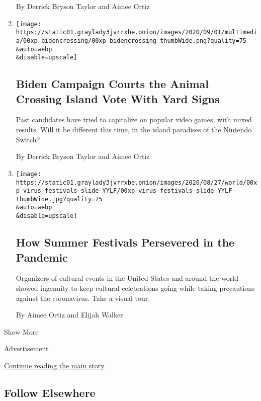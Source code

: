 \begin{enumerate}
  By Derrick Bryson Taylor and Aimee Ortiz
\item
  \href{/2020/09/01/us/politics/biden-animal-crossing.html}{}

  \texttt{[image: https://static01.graylady3jvrrxbe.onion/images/2020/09/01/multimedia/00xp-bidencrossing/00xp-bidencrossing-thumbWide.png?quality=75\\\&auto=webp\\\&disable=upscale]}

  \hypertarget{biden-campaign-courts-the-animal-crossing-island-vote-with-yard-signs}{%
  \subsection{Biden Campaign Courts the Animal Crossing Island Vote With
  Yard
  Signs}\label{biden-campaign-courts-the-animal-crossing-island-vote-with-yard-signs}}

  Past candidates have tried to capitalize on popular video games, with
  mixed results. Will it be different this time, in the island paradises
  of the Nintendo Switch?

  By Derrick Bryson Taylor and Aimee Ortiz
\item
  \href{/2020/08/28/travel/summer-festivals-coronavirus.html}{}

  \texttt{[image: https://static01.graylady3jvrrxbe.onion/images/2020/08/27/world/00xp-virus-festivals-slide-YYLF/00xp-virus-festivals-slide-YYLF-thumbWide.jpg?quality=75\\\&auto=webp\\\&disable=upscale]}

  \hypertarget{how-summer-festivals-persevered-in-the-pandemic}{%
  \subsection{How Summer Festivals Persevered in the
  Pandemic}\label{how-summer-festivals-persevered-in-the-pandemic}}

  Organizers of cultural events in the United States and around the
  world showed ingenuity to keep cultural celebrations going while
  taking precautions against the coronavirus. Take a visual tour.

  By Aimee Ortiz and Elijah Walker
\end{enumerate}

Show More

Advertisement

\protect\hyperlink{after-mid2}{Continue reading the main story}

\hypertarget{follow-elsewhere}{%
\subsection{Follow Elsewhere}\label{follow-elsewhere}}


